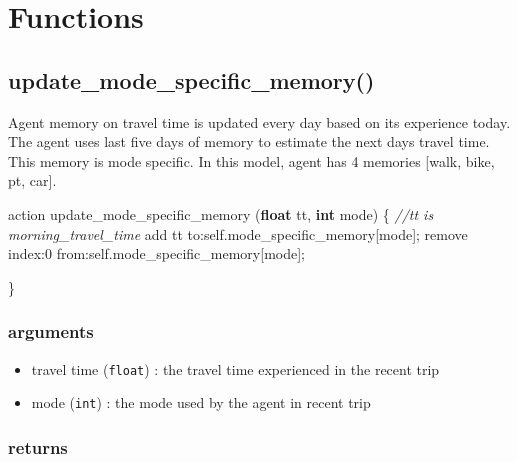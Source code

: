 \documentclass[]{book}
\newenvironment{Shaded}{\begin{snugshade}}{\end{snugshade}}
\newcommand{\CommentTok}[1]{\textcolor[rgb]{0.56,0.35,0.01}{\textit{#1}}}
\newcommand{\DecValTok}[1]{\textcolor[rgb]{0.00,0.00,0.81}{#1}}
\newcommand{\KeywordTok}[1]{\textcolor[rgb]{0.13,0.29,0.53}{\textbf{#1}}}
\newcommand{\NormalTok}[1]{#1}
\newcommand{\OtherTok}[1]{\textcolor[rgb]{0.56,0.35,0.01}{#1}}
\providecommand{\tightlist}{%
  \setlength{\itemsep}{0pt}\setlength{\parskip}{0pt}}
\theoremstyle{definition}
\theoremstyle{definition}
\theoremstyle{definition}
\theoremstyle{remark}
\begin{document}
\hypertarget{functions}{%
\chapter{Functions}\label{functions}}

\hypertarget{update_mode_specific_memory}{%
\section{update\_mode\_specific\_memory()}\label{update_mode_specific_memory}}

Agent memory on travel time is updated every day based on its experience
today. The agent uses last five days of memory to estimate the next days
travel time. This memory is mode specific. In this model, agent has 4
memories {[}walk, bike, pt, car{]}. 

\begin{Shaded}
\begin{Highlighting}[]
\NormalTok{action update_mode_specific_memory }\OtherTok{(}\KeywordTok{float}\NormalTok{ tt}\OtherTok{,} \KeywordTok{int}\NormalTok{ mode}\OtherTok{)}
\NormalTok{  \{}
        \CommentTok{//tt is morning_travel_time}
\NormalTok{        add tt to:self.mode_specific_memory}\OtherTok{[}\NormalTok{mode}\OtherTok{];}
\NormalTok{        remove index:}\DecValTok{0}\NormalTok{ from:self.mode_specific_memory}\OtherTok{[}\NormalTok{mode}\OtherTok{];}
        
\NormalTok{    \}}
\end{Highlighting}
\end{Shaded}

\hypertarget{arguments}{%
\subsection*{arguments}\label{arguments}}

\begin{itemize}
\tightlist
\item
  travel time (\texttt{float}) : the travel time experienced in the
  recent trip
\item
  mode (\texttt{int}) : the mode used by the agent in recent trip
\end{itemize}

\hypertarget{returns}{%
\subsection*{returns}\label{returns}}
\end{document}
